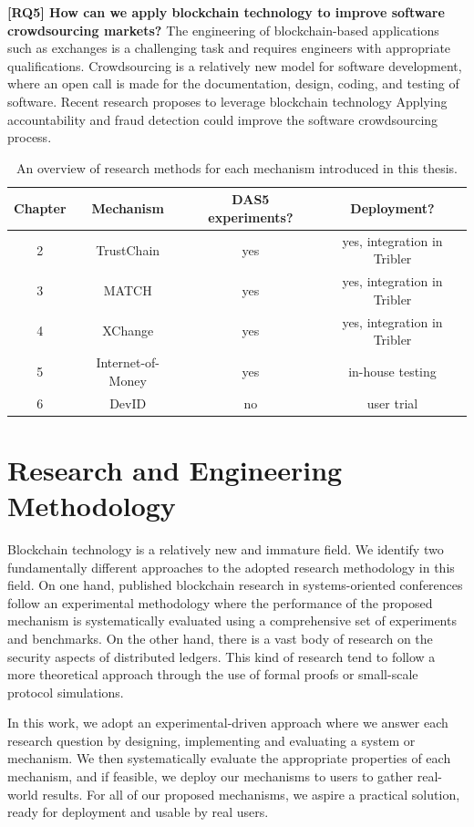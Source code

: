 \textbf{[RQ5] How can we apply blockchain technology to improve software crowdsourcing markets?}
The engineering of blockchain-based applications such as exchanges is a challenging task and requires engineers with appropriate qualifications.
Crowdsourcing is a relatively new model for software development, where an open call is made for the documentation, design, coding, and testing of software.
Recent research proposes to leverage blockchain technology
Applying accountability and fraud detection could improve the software crowdsourcing process.

\begin{table}[t]
	\small
	\centering
	\begin{tabular}{ |c|c|c|c| }
		\hline
		\textbf{Chapter} & \textbf{Mechanism} & \textbf{DAS5 experiments?} & \textbf{Deployment?} \\ \hline
		2 & TrustChain & yes & yes, integration in Tribler \\ \hline
		3 & MATCH & yes & yes, integration in Tribler \\ \hline
		4 & XChange & yes & yes, integration in Tribler \\ \hline
		5 & Internet-of-Money & yes & in-house testing \\ \hline
		6 & DevID & no & user trial \\ \hline
	\end{tabular}
	\caption{An overview of research methods for each mechanism introduced in this thesis.}
	\label{table:research_methodology}
\end{table}

\section{Research and Engineering Methodology}
Blockchain technology is a relatively new and immature field.
We identify two fundamentally different approaches to the adopted research methodology in this field.
On one hand, published blockchain research in systems-oriented conferences follow an experimental methodology where the performance of the proposed mechanism is systematically evaluated using a comprehensive set of experiments and benchmarks.
On the other hand, there is a vast body of research on the security aspects of distributed ledgers.
This kind of research tend to follow a more theoretical approach through the use of formal proofs or small-scale protocol simulations.

In this work, we adopt an experimental-driven approach where we answer each research question by designing, implementing and evaluating a system or mechanism.
We then systematically evaluate the appropriate properties of each mechanism, and if feasible, we deploy our mechanisms to users to gather real-world results.
For all of our proposed mechanisms, we aspire a practical solution, ready for deployment and usable by real users.

